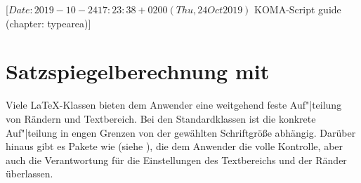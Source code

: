 %
%
%
%
%
%
%
%
% 
%
%
%
%


                 [$Date: 2019-10-24 17:23:38 +0200 (Thu, 24 Oct 2019) $
                  KOMA-Script guide (chapter: typearea)]
\chapter{Satzspiegelberechnung mit }

\BeginIndexGroup%
%
Viele \LaTeX-Klassen bieten dem
Anwender eine weitgehend feste Auf"|teilung von Rändern und Textbereich. Bei
den Standardklassen ist die konkrete Auf"|teilung in engen Grenzen von der
gewählten Schriftgröße abhängig. Darüber hinaus gibt es Pakete wie
 (siehe \cite{package:geometry}), die
dem Anwender die volle Kontrolle, aber auch die Verantwortung für die
Einstellungen des Textbereichs und der Ränder überlassen.

